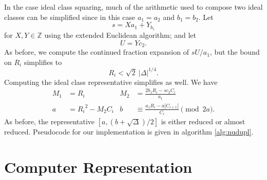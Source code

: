 \documentclass{ucalgthes1}
\theoremstyle{plain}
\theoremstyle{definition}
\newtheorem{defn}[thm]{Definition}
\newcommand{\OO}{\mathcal{O}}
\newcommand{\ZZ}{\mathbb{Z}}
\begin{document}
In the case ideal class squaring, much of the arithmetic used to compose two ideal classes can be simplified since in this case $a_1=a_2$ and $b_1=b_2$.  Let 
\[
	s = Xa_1 + Y_b_1
\]
for $X,Y \in \ZZ$ using the extended Euclidean algorithm; and let 
\[
	U = Yc_2.
\]
As before, we compute the continued fraction expansion of $sU/a_1$, but the bound on $R_i$ simplifies to
\[
	R_i < \sqrt 2 ~ |\Delta|^{1/4}.
\]
Computing the ideal class representative simplifies as well.  We have
\begin{align*}
	M_1 &= R_i & 
	M_2 &= \frac{2b_1R_i - sc_2C_i}{a_1} \\
	a &= {R_i}^2 - M_2C_i &
	b &\equiv \frac{a_1 R_i - a |C_{i+1}|}{C_i} \pmod{2a}.
\end{align*}
As before, the representative $[a, (b+\sqrt\Delta)/2]$ is either reduced or almost reduced.  \break Pseudocode for our implementation is given in algorithm \ref{alg:nudupl}.


\begin{comment}
\bigbreak
\section{To use still}



\begin{defn}
A \emph{prime ideal} of $\OO$ is an invertible $\OO$-ideal $\mathfrak{p} \neq \OO$ with the property that if $\mathfrak{p} | \mathfrak{a}\mathfrak{b}$, for $\OO$-ideals $\mathfrak{a}$ and $\mathfrak{b}$, then $\mathfrak{p} | \mathfrak{a}$ or $\mathfrak{p} | \mathfrak{b}$ \cite{JacobsonCh4}[p.~93].
\end{defn}
In the ideal class group, the reduced form of a prime ideal $\mathfrak{p}$ is given by $[p, \beta]$ where $p \in \ZZ$ is prime.
\end{comment}


\bigbreak
\section{Computer Representation}
\label{section:computerRepresentation}
\end{document}
